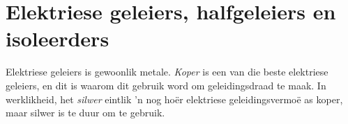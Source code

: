     \noindent



\section{Elektriese geleiers, halfgeleiers en isoleerders}
\nopagebreak

\label{m38706*id66058} 

 Elektriese geleiers is gewoonlik metale. \textsl{Koper} is een van die beste elektriese geleiers, en
dit is waarom dit gebruik word om geleidingsdraad te maak. In werklikheid, het \textsl{silwer} eintlik 'n nog hoër elektriese geleidingsvermoë as koper, maar silwer is te duur om te gebruik.\par \\


